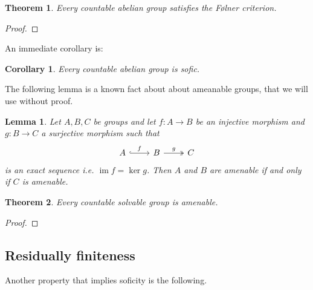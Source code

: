 \documentclass[titlepage, a4paper]{article}
\DeclareMathOperator{\im}{im}
\newtheorem{theorem}{Theorem}
\newtheorem{lemma}{Lemma}
\newtheorem{corollary}{Corollary}
\theoremstyle{remark}
\begin{document}
    \begin{theorem}\label{thm:countable_abelian_folner}
        Every countable abelian group satisfies the Følner criterion. 
    \end{theorem}
    \begin{proof}
        
    \end{proof}
    An immediate corollary is:
    \begin{corollary}
    	Every countable abelian group is sofic.	
    \end{corollary}
	The following lemma is a known fact about about ameanable groups, that we will use without proof.
    \begin{lemma}
        \label{lem:amenable_short_exact_sequence}
        Let $A, B, C$ be groups and let $f: A\to B$ be an injective morphism and $g:B\to C$ a surjective morphism such that 
        \[\begin{tikzcd}
            A \arrow[r, "f", hook] & B \arrow[r, "g", two heads] & C
        \end{tikzcd}\]
        is an exact sequence i.e. $\im f = \ker g$. Then $A$ and $B$ are amenable if and only if $C$ is amenable.
    \end{lemma}

    \begin{theorem}
        Every countable solvable group is amenable. 
    \end{theorem}
    \begin{proof}
        
    \end{proof}

\subsection{Residually finiteness}

Another property that implies soficity is the following.
\end{document}
